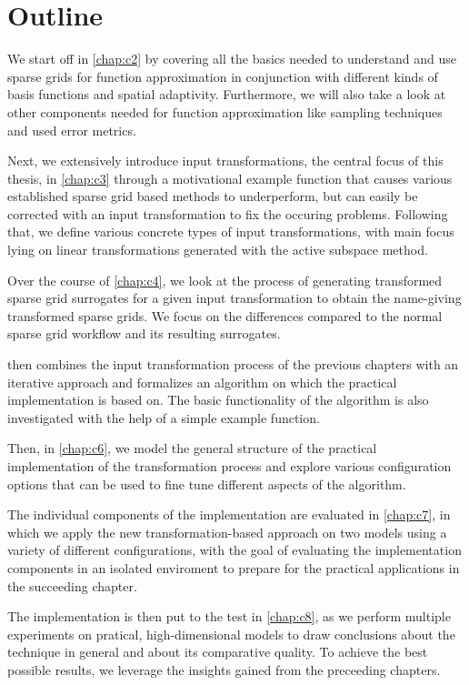 \documentclass[
  a4paper,  %
  twoside,  %
  bibliography=totoc,
  headsepline,
  cleardoublepage=empty,
  parskip=half,
  draft=false
]{scrbook}
\begin{document}
\section{Outline}

We start off in \cref{chap:c2} by covering all the basics needed to understand and use sparse grids for function approximation in conjunction with different kinds of basis functions and spatial adaptivity.
Furthermore, we will also take a look at other components needed for function approximation like sampling techniques and used error metrics.

Next, we extensively introduce input transformations, the central focus of this thesis, in \cref{chap:c3} through a motivational example function that causes various established sparse grid based methods to underperform, but can easily be corrected with an input transformation to fix the occuring  problems.
Following that, we define various concrete types of input transformations, with main focus lying on linear transformations generated with the active subspace method.

Over the course of \cref{chap:c4}, we look at the process of generating transformed sparse grid surrogates for a given input transformation to obtain the name-giving transformed sparse grids.
We focus on the differences compared to the normal sparse grid workflow and its resulting surrogates.

 then combines the input transformation process of the previous chapters with an iterative approach and formalizes an algorithm on which the practical implementation is based on.
The basic functionality of the algorithm is also investigated with the help of a simple example function.

Then, in \cref{chap:c6}, we model the general structure of the practical implementation of the transformation process and explore various configuration options that can be used to fine tune different aspects of the algorithm.

The individual components of the implementation are evaluated in \cref{chap:c7}, in which we apply the new transformation-based approach on two models using a variety of different configurations, with the goal of evaluating the implementation components in an isolated enviroment to prepare for the practical applications in the succeeding chapter.

The implementation is then put to the test in \cref{chap:c8}, as we perform multiple experiments on pratical, high-dimensional models to draw conclusions about the technique in general and about its comparative quality.
To achieve the best possible results, we leverage the insights gained from the preceeding chapters.
\end{document}
